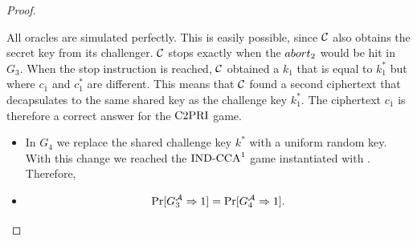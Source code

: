 \begin{proof}
\begin{itemize}
                                                                                            All oracles are simulated perfectly.
                                                                                            This is easily possible, since $\mathcal{C}$ also obtains the secret key from its challenger.
                                                                                            $\mathcal{C}$ stops exactly when the $abort_2$ would be hit in $G_3$.
                                                                                            When the stop instruction is reached, $\mathcal{C}$ obtained a $k_1$ that is equal to $k^*_1$ but where $c_1$ and $c^*_1$ are different.
                                                                                            This means that $\mathcal{C}$ found a second ciphertext that decapsulates to the same shared key as the challenge key $k^*_1$.
                                                                                            The ciphertext $c_1$ is therefore a correct answer for the $\text{C2PRI}$ game.
                                                                                        \end{itemize}

                                                                                        \begin{itemize}
                                                                                        \item[\textbf{Game 4}]
                                                                                            In $G_4$ we replace the shared challenge key $k^*$ with a uniform random key.
                                                                                            With this change we reached the $\text{IND-CCA}^1$ game instantiated with \hqb.
                                                                                            Therefore,

                                                                                        \item[\emph{Claim 4}]

                                                                                            \[ \Pr[G^{\mathcal{A}}_3 \Rightarrow 1] = \Pr[G^{\mathcal{A}}_4 \Rightarrow 1]. \]


\end{itemize}
\end{proof}
